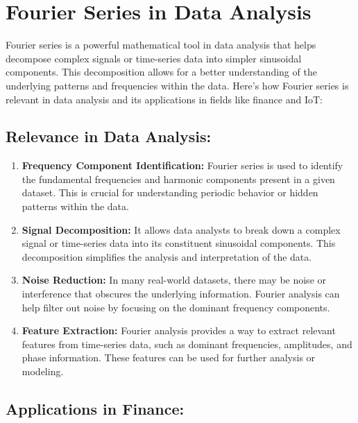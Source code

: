 \documentclass[11pt]{article}
\begin{document}
    \hypertarget{fourier-series-in-data-analysis}{%
\section{Fourier Series in Data
Analysis}\label{fourier-series-in-data-analysis}}

Fourier series is a powerful mathematical tool in data analysis that
helps decompose complex signals or time-series data into simpler
sinusoidal components. This decomposition allows for a better
understanding of the underlying patterns and frequencies within the
data. Here's how Fourier series is relevant in data analysis and its
applications in fields like finance and IoT:

\hypertarget{relevance-in-data-analysis}{%
\subsection{Relevance in Data
Analysis:}\label{relevance-in-data-analysis}}

\begin{enumerate}
\def\labelenumi{\arabic{enumi}.}
\item
  \textbf{Frequency Component Identification:} Fourier series is used to
  identify the fundamental frequencies and harmonic components present
  in a given dataset. This is crucial for understanding periodic
  behavior or hidden patterns within the data.
\item
  \textbf{Signal Decomposition:} It allows data analysts to break down a
  complex signal or time-series data into its constituent sinusoidal
  components. This decomposition simplifies the analysis and
  interpretation of the data.
\item
  \textbf{Noise Reduction:} In many real-world datasets, there may be
  noise or interference that obscures the underlying information.
  Fourier analysis can help filter out noise by focusing on the dominant
  frequency components.
\item
  \textbf{Feature Extraction:} Fourier analysis provides a way to
  extract relevant features from time-series data, such as dominant
  frequencies, amplitudes, and phase information. These features can be
  used for further analysis or modeling.
\end{enumerate}

\hypertarget{applications-in-finance}{%
\subsection{Applications in Finance:}\label{applications-in-finance}}
\end{document}
